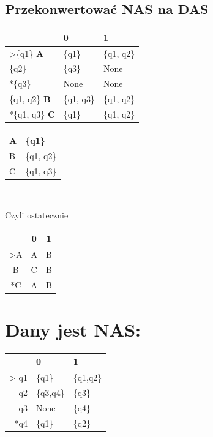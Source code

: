 \documentclass[a4paper,11pt]{article}
\begin{document}
\subsection{Przekonwertować NAS na DAS}
\begin{center}
	\begin{tabular}{|l|l|l|}
		\hline
		                       & 0          & 1          \\ \hline
		>\{q1\} \textbf{A}     & \{q1\}     & \{q1, q2\} \\ \hline
		\{q2\}                 & \{q3\}     & None       \\ \hline
		*\{q3\}                & None       & None       \\ \hline
		\{q1, q2\} \textbf{B}  & \{q1, q3\} & \{q1, q2\} \\ \hline
		*\{q1, q3\} \textbf{C} & \{q1\}     & \{q1, q2\} \\ \hline

	\end{tabular}
	\hspace{1cm}
	\begin{tabular}{|l|l|}
		\hline
		A & \{q1\}     \\ \hline
		B & \{q1, q2\} \\ \hline
		C & \{q1, q3\} \\ \hline
	\end{tabular}
	\\
	\vspace{1cm}

	Czyli ostatecznie \\
	\begin{tabular}{|c|c|c|}
		\hline
		   & 0 & 1 \\ \hline
		>A & A & B \\ \hline
		B  & C & B \\ \hline
		*C & A & B \\ \hline
	\end{tabular}

\end{center}

\newpage
\section{Dany jest NAS:}
\begin{center}
	\begin{tabular}{rcc}
		\hline
		\multicolumn{1}{|r|}{}     & \multicolumn{1}{l|}{0}         & \multicolumn{1}{l|}{1}         \\ \hline
		\multicolumn{1}{|r|}{> q1} & \multicolumn{1}{l|}{\{q1\}}    & \multicolumn{1}{l|}{\{q1,q2\}} \\ \hline
		\multicolumn{1}{|r|}{q2}   & \multicolumn{1}{l|}{\{q3,q4\}} & \multicolumn{1}{l|}{\{q3\}}    \\ \hline
		\multicolumn{1}{|r|}{q3}   & \multicolumn{1}{l|}{None}      & \multicolumn{1}{l|}{\{q4\}}    \\ \hline
		\multicolumn{1}{|r|}{*q4}  & \multicolumn{1}{l|}{\{q1\}}    & \multicolumn{1}{l|}{\{q2\}}    \\ \hline
	\end{tabular}
\end{center}
\end{document}

